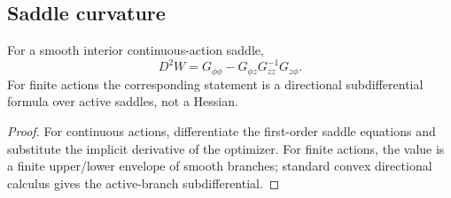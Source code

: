 \subsection{Saddle curvature}

\begin{theorem}
\label{thm:rr2-c1-hessian}
For a smooth interior continuous-action saddle,
\[
 D^2W
 =
 G_{\phi\phi}-G_{\phi z}G_{zz}^{-1}G_{z\phi}.
\]
For finite actions the corresponding statement is a directional
subdifferential formula over active saddles, not a Hessian.
\end{theorem}

\begin{proof}
For continuous actions, differentiate the first-order saddle equations and
substitute the implicit derivative of the optimizer.  For finite actions,
the value is a finite upper/lower envelope of smooth branches; standard
convex directional calculus gives the active-branch subdifferential.
\end{proof}
